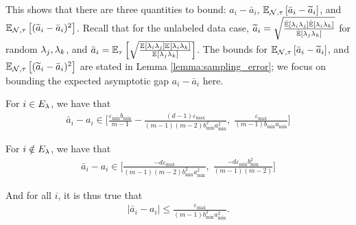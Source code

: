 This shows that there are three quantities to bound: $a_i - \bar{a}_i$, $\mathbb{E}_{\mathcal{N}, \tau}\left[\bar{a}_i - \widetilde{a}_i\right]$, and $\mathbb{E}_{\mathcal{N}, \tau}\left[(\widetilde{a}_i - \bar{a}_i)^2\right]$. Recall that for the unlabeled data case, $\widetilde{a}_i = \sqrt{\frac{\hat{\mathbb{E}}\left[\lambda_i \lambda_j\right] \hat{\mathbb{E}}\left[\lambda_i \lambda_k\right]}{\hat{\mathbb{E}}\left[\lambda_j \lambda_k\right]}}$ for random $\lambda_j, \lambda_k$, and $\bar{a}_i = \mathbb{E}_{\tau}\left[\sqrt{\frac{\mathbb{E}_{}\left[\lambda_i \lambda_j\right] \mathbb{E}_{}\left[\lambda_i \lambda_k\right]}{\mathbb{E}_{}\left[\lambda_j \lambda_k\right]}}\right]$. The bounds for $\mathbb{E}_{\mathcal{N}, \tau}\left[\bar{a}_i - \widetilde{a}_i\right]$, and $\mathbb{E}_{\mathcal{N}, \tau}\left[(\widetilde{a}_i - \bar{a}_i)^2\right]$ are stated in Lemma \ref{lemma:sampling_error}; we focus on bounding the expected asymptotic gap $a_i - \bar{a}_i$ here. 

\begin{lemma}
For $i \in E_{\lambda}$, we have that
\begin{align}
    \bar{a}_i - a_i \in \bigg[\frac{\varepsilon_{\min} b_{\min}}{m - 1} - \frac{(d - 1)\varepsilon_{\max}}{(m - 1)(m - 2) b_{\min}^2 a_{\min}^2}, \; \frac{\varepsilon_{\max}}{(m - 1) b_{\min}a_{\min}} \bigg]
\end{align}

For $i \notin E_{\lambda}$, we have that
\begin{align}
    \bar{a}_i - a_i \in \bigg[\frac{-d \varepsilon_{\max}}{(m - 1)(m - 2) b_{\min}^2 a_{\min}^2}, \; \frac{-d \varepsilon_{\min} b_{\min}^2}{(m - 1)(m - 2)} \bigg]
\end{align}

\label{lemma:accuracy_bias}
\end{lemma}

And for all $i$, it is thus true that
\begin{align}
    |\bar{a}_i - a_i| \le \frac{\varepsilon_{\max}}{(m - 1)b_{\min}^2 a_{\min}^2}.
\end{align}

